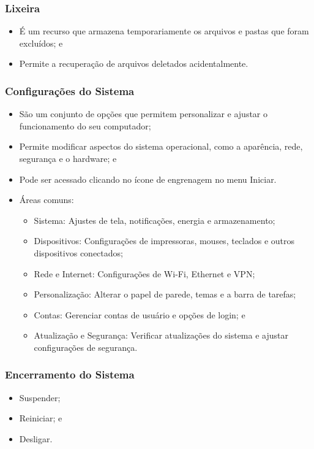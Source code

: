 \documentclass[aspectratio=169]{beamer} %
\begin{document}
\begin{frame}
	\frametitle{Lixeira}
	
	\begin{itemize}
		\item É um recurso que armazena temporariamente os arquivos e pastas que foram excluídos; e
		\item Permite a recuperação de arquivos deletados acidentalmente.
	\end{itemize}
\end{frame}

\begin{frame}
	\frametitle{Configurações do Sistema}
	
	\begin{itemize}
		\item São um conjunto de opções que permitem personalizar e ajustar o funcionamento do seu computador;
		\item Permite modificar aspectos do sistema operacional, como a aparência, rede, segurança e o hardware; e
		\item Pode ser acessado clicando no ícone de engrenagem no menu Iniciar.
		\item Áreas comuns:
		\begin{itemize}
			\item Sistema: Ajustes de tela, notificações, energia e armazenamento;
			\item Dispositivos: Configurações de impressoras, mouses, teclados e outros dispositivos conectados;
			\item Rede e Internet: Configurações de Wi-Fi, Ethernet e VPN;
			\item Personalização: Alterar o papel de parede, temas e a barra de tarefas;
			\item Contas: Gerenciar contas de usuário e opções de login; e
			\item Atualização e Segurança: Verificar atualizações do sistema e ajustar configurações de segurança.
		\end{itemize}
	\end{itemize}
\end{frame}

\begin{frame}
	\frametitle{Encerramento do Sistema}
	
	\begin{itemize}
		\item Suspender;
		\item Reiniciar; e
		\item Desligar.
	\end{itemize}
\end{frame}
\end{document}
